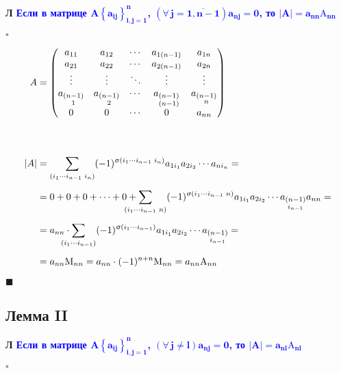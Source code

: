 \documentclass[12pt, a4paper]{report}
\newcommand{\sqbox}{%
	\collectbox{%
		\setlength{\fboxsep}{2pt}%
		\fbox{\BOXCONTENT}%
	}%
}
\newcommand{\lm}[1][]{\begin{flushleft}\textbf{\sqbox{Л} \textcolor{Blue}{#1}}\end{flushleft}}
\newcommand{\inlineperm}[3][i]{{#1}_{#2}\dotsb{#1}_{#3}}
\let\oldforall\forall
\renewcommand{\forall}{\oldforall\,}
\begin{document}
	\lm[Если в матрице $\boldsymbol{A\left\{a_{ij}\right\}_{i,j=1}^{n}}$, $\boldsymbol{\left(\forall j=\overline{1,n-1}\right)a_{nj}=0}$, то $\boldsymbol{|A|=a_{nn}\mathrm{A}_{nn}}$]
	
	\(\square\)
	
	\begin{gather}
	\begin{align*}
		A &=\begin{pmatrix}
			a_{11}&a_{12}&\cdots&a_{1(n-1)}&a_{1n}\\
			a_{21}&a_{22}&\cdots&a_{2(n-1)}&a_{2n}\\
			\vdots&\vdots&\ddots&\vdots&\vdots\\
			a_{\substack{(n-1)\\1}}&a_{\substack{(n-1)\\2}}&\cdots&a_{\substack{(n-1)\\(n-1)}}&a_{\substack{(n-1)\\n}}\\
			0&0&\cdots&0&a_{nn}\\
			\end{pmatrix}
		\\[35pt]
		|A| &= \sum_{(\inlineperm{1}{n-1}\,\,i_n)}(-1)^{\upsigma({\inlineperm{1}{n-1}\,\, i_n})}a_{1i_1}a_{2i_2}\cdots a_{ni_n}=\\[5pt]
		&=0+0+0+\dotsb+0+\smashoperator[l]{\sum_{(\inlineperm{1}{n-1}\,\,n)}}(-1)^{\upsigma(\inlineperm{1}{n-1}\,\,n)}a_{1i_1}a_{2i_2}\cdots a_{\substack{(n-1)\\i_{n-1}}}a_{nn}=\\[5pt]
		&=a_{nn}\cdot\smashoperator[l]{\sum_{(\inlineperm{1}{n-1})}}(-1)^{\upsigma(\inlineperm{1}{n-1})}a_{1i_1}a_{2i_2}\cdots a_{\substack{(n-1)\\i_{n-1}}}=\\[5pt]
		&=a_{nn}\mathrm{M}_{nn}=a_{nn}\cdot (-1)^{n+n}\mathrm{M}_{nn}=a_{nn}\mathrm{A}_{nn}
	\end{align*}
	\end{gather}
	
	\(\blacksquare\)
	\subsection{Лемма II}\label{2.5.3}
	
	\lm[Если в матрице \(\boldsymbol{A\left\{a_{ij}\right\}_{i,j=1}^{n}}\), \(\boldsymbol{\left(\forall j\neq l\right) a_{nj}=0}\), то \(\boldsymbol{|A|=a_{nl}\mathrm{A}_{nl}}\)]
	
	\(\square\)
	
\end{document}
